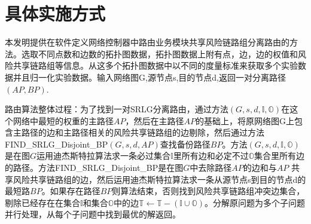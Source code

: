 \section*{具体实施方式}
本发明提供在软件定义网络控制器中路由业务模块共享风险链路组分离路由的方法。选取不同点数和边数的拓扑图数据，拓扑图数据上附有点，边，边的权值和风险共享链路组等信息。从这多个拓扑图数据中以不同的度量标准来获取多个实验数据并且归一化实验数据。输入网络图G,源节点s,目的节点d,返回一对分离路径$(AP,BP)$.

路由算法整体过程：为了找到一对SRLG分离路由，通过方法$(G,s,d, \mathbb{I},\mathbb{O})$在这个网络中最短的权重的主路径$AP$，然后在主路径$AP$的基础上，将原网络图G上包含主路径的边和主路径相关的风险共享链路组的边剔除，然后通过方法FIND\_SRLG\_Disjoint\_BP$(G,s,d,AP)$查找备份路径$BP$。方法$(G,s,d, \mathbb{I},\mathbb{O})$是在图$G$运用迪杰斯特拉算法求一条必过集合$\mathbb{I}$里所有边和必定不过$\mathbb{O}$集合里所有边的路径。方法FIND\_SRLG\_Disjoint\_BP是在图$G$中去除路径$AP$的边和与$AP$ 共享风险共享链路组的边，然后运用迪杰斯特拉算法求一条从源节点s到目的节点d的最短路$BP$。如果存在路径$BP$则算法结束，否则找到风险共享链路组冲突边集合，剔除已经存在在集合$\mathbb{I}$和集合$\mathbb{O}$中的边$\mathbb{T}\leftarrow \mathbb{T}-(\mathbb{I}\cup\mathbb{O})$。分解原问题为多个子问题并行处理，从每个子问题中找到最优的解返回。
